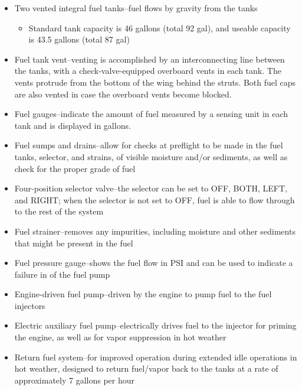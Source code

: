 \begin{itemize}
  \item Two vented integral fuel tanks--fuel flows by gravity from the tanks
    \begin{itemize}
      \item Standard tank capacity is 46 gallons (total 92 gal), and
        useable capacity is 43.5 gallons (total 87 gal)
    \end{itemize}

  \item Fuel tank vent--venting is accomplished by an interconnecting line
    between the tanks, with a check-valve-equipped overboard vents in each
    tank. The vents protrude from the bottom of the wing behind the struts.
    Both fuel caps are also vented in case the overboard vents become blocked.

  \item Fuel gauges--indicate the amount of fuel measured by a sensing unit
    in each tank and is displayed in gallons.

  \item Fuel sumps and drains--allow for checks at preflight to be made in
    the fuel tanks, selector, and strains, of visible moisture and/or
    sediments, as well as check for the proper grade of fuel

  \item Four-position selector valve--the selector can be set to OFF, BOTH,
    LEFT, and RIGHT; when the selector is not set to OFF, fuel is able to
    flow through to the rest of the system

  \item Fuel strainer--removes any impurities, including moisture and other
    sediments that might be present in the fuel

  \item Fuel pressure gauge--shows the fuel flow in PSI and can be used to
    indicate a failure in of the fuel pump

  \item Engine-driven fuel pump--driven by the engine to pump fuel to the fuel
    injectors

  \item Electric auxiliary fuel pump--electrically drives fuel to the injector
    for priming the engine, as well as for vapor suppression in hot weather

  \item Return fuel system--for improved operation during extended idle
    operations in hot weather, designed to return fuel/vapor back to the tanks
    at a rate of approximately 7 gallons per hour
\end{itemize}

